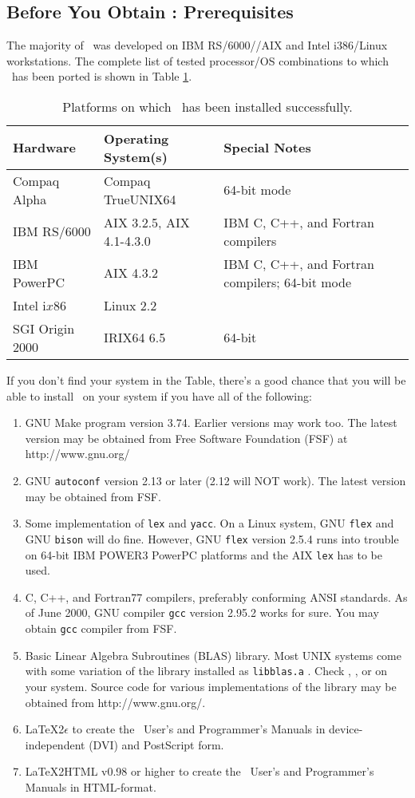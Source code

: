 \subsection{Before You Obtain \PSIthree: Prerequisites}
The majority of \PSIthree\ was developed on IBM RS/6000//AIX
and Intel i386/Linux workstations. The complete list of
tested processor/OS combinations to which \PSIthree\ has
been ported is shown in Table \ref{table:ports}.
\begin{table}
\caption{Platforms on which \PSIthree\ has been installed successfully.} \label{table:ports}
\begin{tabular}{lll} \hline\hline
Hardware & Operating System(s) & Special Notes \\ \hline
Compaq Alpha & Compaq TrueUNIX64 & 64-bit mode \\
IBM RS/6000 & AIX 3.2.5, AIX 4.1-4.3.0 &
IBM C, C++, and Fortran compilers\\
IBM PowerPC & AIX 4.3.2 & 
IBM C, C++, and Fortran compilers;
64-bit mode\\
Intel i$x$86 & Linux 2.2 & \\
SGI Origin 2000 & IRIX64 6.5 & 64-bit \\ \hline\hline
\end{tabular}
\end{table}
If you don't find your system in the Table, there's a good chance
that you will be able to install \PSIthree\ on your system
if you have all of the following:
\begin{enumerate}
\item GNU Make program  version 3.74. Earlier versions may work too.
The latest version may be obtained from Free Software Foundation
(FSF) at 
{http://www.gnu.org/}
\item GNU {\tt autoconf} version 2.13 or later (2.12 will NOT work). The latest version
may be obtained from FSF.
\item Some implementation of {\tt lex} and {\tt yacc}. On a Linux system, GNU {\tt flex}
and GNU {\tt bison} will do fine. However, GNU {\tt flex} version 2.5.4 runs into trouble on
64-bit IBM POWER3 PowerPC platforms and the AIX {\tt lex} has to be used.
\item C, C++, and Fortran77 compilers, preferably conforming ANSI standards.
As of June 2000, GNU compiler {\tt gcc} version 2.95.2 works for sure.
You may obtain {\tt gcc} compiler from FSF.
\item Basic Linear Algebra Subroutines (BLAS) library. Most UNIX systems
come with some variation of the library installed as {\tt libblas.a} .
Check , , or  on your system.
Source code for various implementations of the library may be obtained
from 
{http://www.gnu.org/}.
\item LaTeX2$\epsilon$ to create the \PSIthree\ User's and Programmer's Manuals
in device-independent (DVI) and PostScript form.
\item LaTeX2HTML v0.98 or higher to create the \PSIthree\ User's and
Programmer's Manuals in HTML-format.
\end{enumerate}
